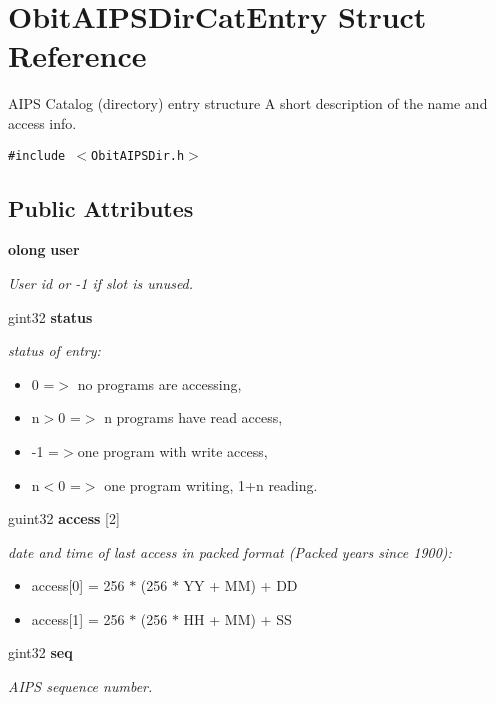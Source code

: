 \section{Obit\-AIPSDir\-Cat\-Entry Struct Reference}
\label{structObitAIPSDirCatEntry}
AIPS Catalog (directory) entry structure A short description of the name and access info.  


{\tt \#include $<$Obit\-AIPSDir.h$>$}

\subsection*{Public Attributes}
\begin{CompactItemize}
\item 
{\bf olong} {\bf user}
\begin{CompactList}\small\item\em User id or -1 if slot is unused. \item\end{CompactList}\item 
gint32 {\bf status}
\begin{CompactList}\small\item\em status of entry: \begin{itemize}
\item 0 =$>$ no programs are accessing, \item n$>$0 =$>$ n programs have read access, \item -1 =$>$one program with write access, \item n$<$0 =$>$ one program writing, 1+n reading. \end{itemize}
\item\end{CompactList}\item 
guint32 {\bf access} [2]
\begin{CompactList}\small\item\em date and time of last access in packed format (Packed years since 1900): \begin{itemize}
\item access[0] = 256 $\ast$ (256 $\ast$ YY + MM) + DD \item access[1] = 256 $\ast$ (256 $\ast$ HH + MM) + SS \end{itemize}
\item\end{CompactList}\item 
gint32 {\bf seq}
\begin{CompactList}\small\item\em AIPS sequence number. \item\end{CompactList}\item 

\end{CompactItemize}
